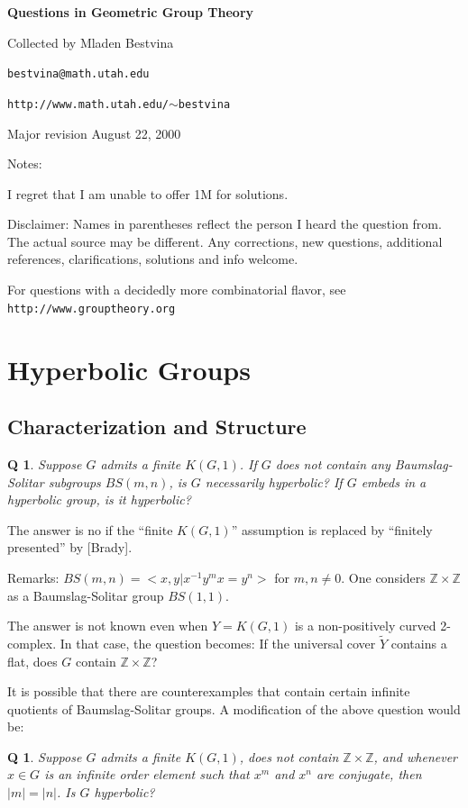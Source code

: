 \documentclass[11pt]{article}
\newtheorem{q}[thm]{Q}
\theoremstyle{remark}
\def\Z{{\mathbb Z}}
\newcommand{\<}{\langle}
\renewcommand{\>}{\rangle}
\begin{document}
\centerline{\Huge\bf Questions in Geometric Group Theory}
\vskip 1cm
\centerline{\Large Collected by Mladen Bestvina}
\centerline{\tt bestvina@math.utah.edu}
\centerline{\tt http://www.math.utah.edu/$\sim$bestvina}
\centerline{Major revision August 22, 2000}
\vskip 1cm
Notes: 


I regret that I am unable to offer 1M for solutions.

Disclaimer: Names in parentheses reflect the person I heard the question from.
The actual source may be different. Any corrections, new questions, additional
references, clarifications, solutions and info welcome.

For questions with a decidedly more combinatorial flavor, see \newline
{\tt
  http://www.grouptheory.org}

\section{Hyperbolic Groups}

\subsection{Characterization and Structure}



\begin{q}
Suppose $G$ admits a finite $K(G,1)$. If $G$ does not contain any
Baumslag-Solitar subgroups $BS(m,n)$, is $G$ necessarily hyperbolic? If $G$
embeds in a hyperbolic group, is it hyperbolic? 
\end{q}

The answer is no if the
``finite $K(G,1)$'' assumption is replaced by ``finitely presented'' by
[Brady].

Remarks: $BS(m,n)=<x,y|x^{-1}y^mx=y^n>$ for $m,n\neq 0$.
One considers $\Z\times\Z$ as a Baumslag-Solitar group $BS(1,1)$. 

The answer is not known even when $Y=K(G,1)$ is a non-positively curved
2-complex. In that case, the question becomes: If the universal cover $\tilde
Y$ contains a flat, does $G$ contain $\Z\times\Z$?

It is possible that there are counterexamples that contain certain infinite
quotients of Baumslag-Solitar groups. A modification of the above question
would be: 

\begin{q}
Suppose $G$ admits a finite $K(G,1)$, does not contain $\Z\times\Z$, and
whenever $x\in G$ is an infinite order element such that $x^m$ and $x^n$ are
conjugate, then $|m|=|n|$. Is $G$ hyperbolic?
\end{q}
\end{document}
